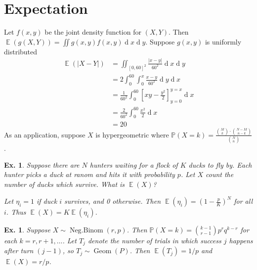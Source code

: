 \documentclass[12pt, a4paper]{book}
\DeclareMathOperator{\E}{\mathbb{E}}
\renewcommand{\Pr}{\mathbb{P}}
\renewcommand{\d}[1]{\ensuremath{\operatorname{d}\!{#1}}} %
\newtheorem{example}[theorem]{Ex.}
\theoremstyle{nonumberplain}
\begin{document}
\section{Expectation}
Let $f(x,y)$ be the joint density function for $(X,Y)$.
Then $\E(g(X,Y))=\iint g(x,y)f(x,y)\d{x}\d{y}$.
Suppose $g(x,y)$ is uniformly distributed 
\begin{align*}
    \E(|X-Y|) &= \iint_{[0,60]^2}\frac{|x-y|}{60^2}\d{x}\d{y}\\
              &= 2\int_0^{60}\int_0^x\frac{x-y}{60^2}\d{y}\d{x}\\
              &= \frac{1}{60^2}\int_0^{60}\left[xy-\frac{y^2}{2}\right]_{y=0}^{y=x}\d{x}\\
              &= \frac{2}{60^2}\int_0^{60}\frac{x^2}{2}\d{x}\\
              &= 20
\end{align*}
As an application, suppose $X$ is hypergeometric where $\Pr(X=k)=\frac{\binom{M}{k}\cdot\binom{N-M}{n-k}}{\binom{N}{n}}$.
\begin{example}
    Suppose there are $N$ hunters waiting for a flock of $K$ ducks to fly by.
    Each hunter picks a duck at ranom and hits it with probability $p$.
    Let $X$ count the number of ducks which survive.
    What is $\E(X)$?

    Let $\eta_i=1$ if duck $i$ survives, and 0 otherwise.
    Then $\E(\eta_i)=\left(1-\frac{p}{K}\right)^N$ for all $i$.
    Thus $\E(X)=K\E(\eta_i)$.
\end{example}
\begin{example}
    Suppose $X\sim\operatorname{Neg.Binom}(r,p)$.
    Then $\Pr(X=k)=\binom{k-1}{r-1}p^rq^{k-r}$ for each $k=r,r+1,\ldots$.
    Let $T_j$ denote the number of trials in which success $j$ happens after turn $(j-1)$, so $T_j\sim\operatorname{Geom}(P)$.
    Then $\E(T_j)=1/p$ and $\E(X)=r/p$.
\end{example}
\end{document}

